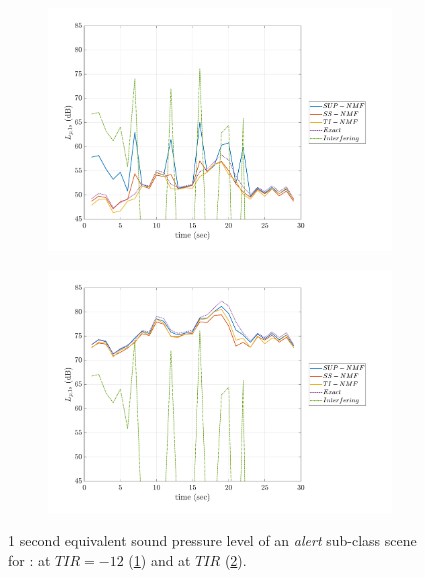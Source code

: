 \documentclass[twocolumn,a4paper,10pt]{article}
\begin{document}
\begin{figure}[t]
    \centering
    \begin{subfigure}[t]{0.45\textwidth}
        \centering
        \includegraphics[width=\linewidth]{figures/NMF_Lp_alert-12.pdf}
        \caption{}
        \label{fig:lp_alert_-12}
    \end{subfigure}%
    \hfill
    \begin{subfigure}[t]{0.45\textwidth}
        \centering
        \includegraphics[width=\linewidth]{figures/NMF_Lp_alert12.pdf}
        \caption{}
        \label{fig:lp_alert_12}
    \end{subfigure}

    \caption{1 second equivalent sound pressure level of an \textit{alert} sub-class scene for : at $TIR = -12$ (\ref{fig:lp_alert_-12}) and at $TIR$ (\ref{fig:lp_alert_12}).}
    \label{fig:lp_alert}
\end{figure}
\end{document}
